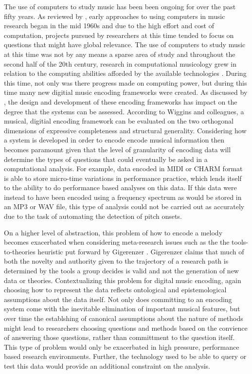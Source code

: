 \documentclass[12pt,]{book}
\begin{document}
The use of computers to study music has been been ongoing for over the past fifty years.
As reviewed by \citet{hewlettComputingMusicology1991}, early approaches to using computers in music research began in the mid 1960s and due to the high effort and cost of computation, projects pursued by researchers at this time tended to focus on questions that might have global relevance.
The use of computers to study music at this time was not by any means a sparse area of study and throughout the second half of the 20th century, research in computational musicology grew in relation to the computing abilities afforded by the available technologies \citep{nettheimBibliographyStatisticalApplications1997}.
During this time, not only was there progress made on computing power, but during this time many new digitial music encoding frameworks were created.
As discussed by \citet{wigginsFrameworkEvaluationMusic1993}, the design and development of these encoding frameworks has impact on the degree that the systems can be assessed.
According to Wiggins and colleagues, a musical, digitial encoding framework can be evaluated on the two orthogonal dimensions of expressive completeness and structural generality.
Considering how a system is developed in order to encode encode musical information then becomes paramount given that the level of granularity of encoding data will determine the types of questions that could eventually be asked in a computational analysis.
For example, data encoded in MIDI or CHARM format is able to store micro-time variations in performance practice, which lends itself to the ability to do performance based analyses on this data.
If this data were instead to have been encoded using a frequency spectrum as would be stored in an MP3 or WAV file, this type of analysis could not be carried out as accurately due to the task of automating the detection of pitch onsets.

On a higher level of abstraction, this problem of how to encode a melody becomes exacerbated when considering meta-research issues such as the the tools-to-theories heuristic put forward by Gigerenzer \citep{gigerenzerToolsTheoriesHeuristic1991}.
Gigerenzer claims that much of both the novelty and authority given to the trajectory of a research path is determined by the tools a group decides is valid and not the generation of new data or theories.
Contextualizing this problem for digital music encoding, again choosing how to represent the data reflects ontological and epistemological assumptions about the data itself.
Not only does committing to an encoding system come with the inevitable elimination of important musical features, but over time the establshing of canonical assumptions about the nature of methods might lead to researchers choosing questions and methods based on the convience of answering those questions, rather than committment to the question itself.
This type of problem would only be exacerbated in high pressure, performance based research environments.
Further, the technology used to be able to query or test this data would provide an additional constraint on the analysis.
\end{document}

